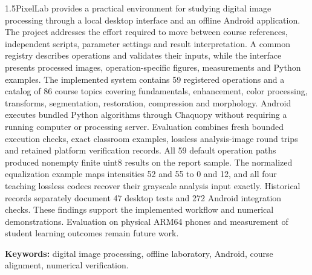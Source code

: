 \begin{spacing}{1.5}PixelLab provides a practical environment for studying digital image processing through a local desktop interface and an offline Android application. The project addresses the effort required to move between course references, independent scripts, parameter settings and result interpretation. A common registry describes operations and validates their inputs, while the interface presents processed images, operation-specific figures, measurements and Python examples. The implemented system contains 59 registered operations and a catalog of 86 course topics covering fundamentals, enhancement, color processing, transforms, segmentation, restoration, compression and morphology. Android executes bundled Python algorithms through Chaquopy without requiring a running computer or processing server. Evaluation combines fresh bounded execution checks, exact classroom examples, lossless analysis-image round trips and retained platform verification records. All 59 default operation paths produced nonempty finite uint8 results on the report sample. The normalized equalization example maps intensities 52 and 55 to 0 and 12, and all four teaching lossless codecs recover their grayscale analysis input exactly. Historical records separately document 47 desktop tests and 272 Android integration checks. These findings support the implemented workflow and numerical demonstrations. Evaluation on physical ARM64 phones and measurement of student learning outcomes remain future work.\par\medskip\textbf{Keywords:} digital image processing, offline laboratory, Android, course alignment, numerical verification.\end{spacing}